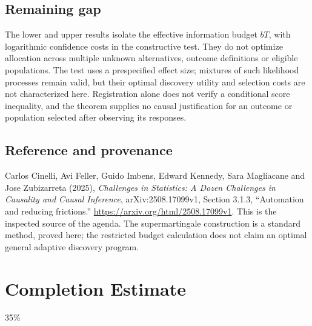 \documentclass[11pt,a4paper]{article}
\begin{document}
\subsection*{Remaining gap}
The lower and upper results isolate the effective information budget $bT$, with logarithmic confidence costs in the constructive test. They do not optimize allocation across multiple unknown alternatives, outcome definitions or eligible populations. The test uses a prespecified effect size; mixtures of such likelihood processes remain valid, but their optimal discovery utility and selection costs are not characterized here. Registration alone does not verify a conditional score inequality, and the theorem supplies no causal justification for an outcome or population selected after observing its responses.

\subsection*{Reference and provenance}
Carlos Cinelli, Avi Feller, Guido Imbens, Edward Kennedy, Sara Magliacane and Jose Zubizarreta (2025), \emph{Challenges in Statistics: A Dozen Challenges in Causality and Causal Inference}, arXiv:2508.17099v1, Section 3.1.3, ``Automation and reducing frictions.'' \url{https://arxiv.org/html/2508.17099v1}. This is the inspected source of the agenda. The supermartingale construction is a standard method, proved here; the restricted budget calculation does not claim an optimal general adaptive discovery program.

\section{Completion Estimate}
35\%
\end{document}
